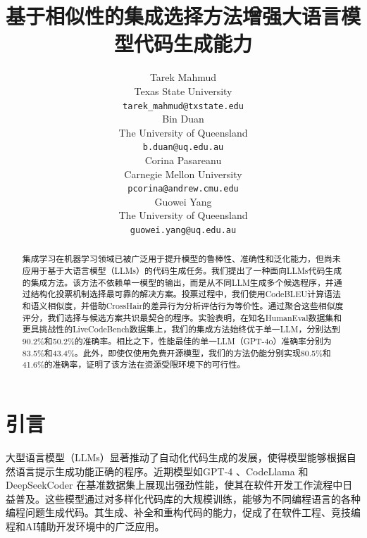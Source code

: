 \documentclass{article}
\begin{document}
\title{基于相似性的集成选择方法增强大语言模型代码生成能力}

\author{
 Tarek Mahmud \\
  Texas State University\\
  \texttt{tarek\_mahmud@txstate.edu} \\
   \And
 Bin Duan \\
  The University of Queensland \\
  \texttt{b.duan@uq.edu.au} \\
  \And
 Corina Pasareanu \\
  Carnegie Mellon University \\
  \texttt{pcorina@andrew.cmu.edu} \\
  \And
 Guowei Yang \\
  The University of Queensland \\
  \texttt{guowei.yang@uq.edu.au} \\
}

\maketitle
\begin{abstract}
集成学习在机器学习领域已被广泛用于提升模型的鲁棒性、准确性和泛化能力，但尚未应用于基于大语言模型（LLMs）的代码生成任务。我们提出了一种面向LLMs代码生成的集成方法。该方法不依赖单一模型的输出，而是从不同LLM生成多个候选程序，并通过结构化投票机制选择最可靠的解决方案。投票过程中，我们使用CodeBLEU计算语法和语义相似度，并借助CrossHair的差异行为分析评估行为等价性。通过聚合这些相似度评分，我们选择与候选方案共识最契合的程序。实验表明，在知名HumanEval数据集和更具挑战性的LiveCodeBench数据集上，我们的集成方法始终优于单一LLM，分别达到90.2\%和50.2\%的准确率。相比之下，性能最佳的单一LLM（GPT-4o）准确率分别为83.5\%和43.4\%。此外，即使仅使用免费开源模型，我们的方法仍能分别实现80.5\%和41.6\%的准确率，证明了该方法在资源受限环境下的可行性。
\end{abstract}

\section{引言}
大型语言模型（LLMs）\cite{brown2020language}显著推动了自动化代码生成的发展，使得模型能够根据自然语言提示生成功能正确的程序。近期模型如GPT-4 \cite{gpt4}、CodeLlama \cite{codellama}和DeepSeekCoder \cite{deepseekcoder}在基准数据集上展现出强劲性能，使其在软件开发工作流程中日益普及。这些模型通过对多样化代码库的大规模训练，能够为不同编程语言的各种编程问题生成代码。其生成、补全和重构代码的能力，促成了在软件工程、竞技编程和AI辅助开发环境中的广泛应用。
\end{document}
